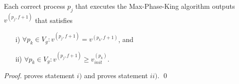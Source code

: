 \documentclass[runningheads]{llncs}
\begin{document}
\begin{theorem}
    Each correct process $p_j$ that executes the Max-Phase-King algorithm outputs $v^{(p_j, f+1)}$ that satisfies
    \begin{enumerate}
        \item[i)] $\forall p_k \in V_g: v^{(p_j, f+1)} = v^{(p_k, f+1)}$, and 
        \item[ii)] $\forall p_k \in V_g: v^{(p_j, f+1)} \geq v_{init}^{(p_k)}$.
    \end{enumerate}
\end{theorem}
\begin{proof}
     proves statement $i)$ and  proves statement $ii)$. \qed
\end{proof}
\end{document}
